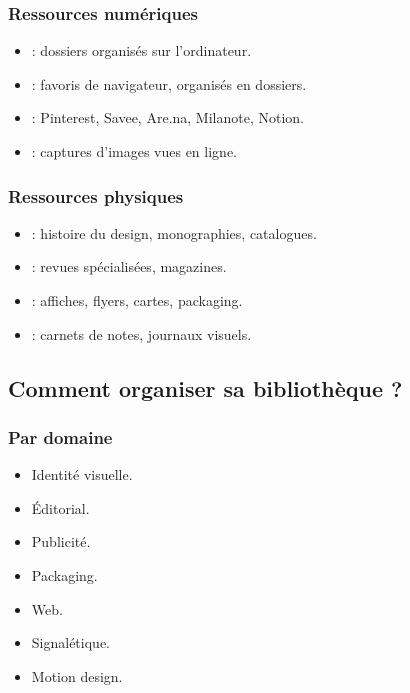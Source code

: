 \subsubsection{Ressources numériques}

\begin{itemize}
    \item {} : dossiers organisés sur l'ordinateur.
    \item {} : favoris de navigateur, organisés en dossiers.
    \item {} : Pinterest, Savee, Are.na, Milanote, Notion.
    \item {} : captures d'images vues en ligne.
\end{itemize}

\subsubsection{Ressources physiques}

\begin{itemize}
    \item {} : histoire du design, monographies, catalogues.
    \item {} : revues spécialisées, magazines.
    \item {} : affiches, flyers, cartes, packaging.
    \item {} : carnets de notes, journaux visuels.
\end{itemize}

\subsection{Comment organiser sa bibliothèque ?}

\subsubsection{Par domaine}

\begin{itemize}
    \item Identité visuelle.
    \item Éditorial.
    \item Publicité.
    \item Packaging.
    \item Web.
    \item Signalétique.
    \item Motion design.
\end{itemize}

